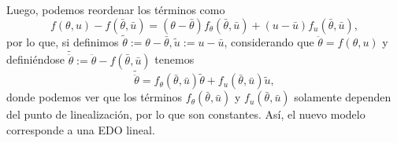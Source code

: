\documentclass[
  11pt,
  letterpaper,
   addpoints,
   answers
  ]{exam}
\begin{document}
\begin{questions}
\begin{solution}
Luego, podemos reordenar los términos como
\begin{equation}
    f(\theta, u) - f(\bar{\theta}, \bar{u}) = (\theta - \bar{\theta}) f_{\theta} (\bar{\theta}, \bar{u}) + (u - \bar{u}) f_{u} (\bar{\theta}, \bar{u}), \tag{35}
\end{equation}
por lo que, si definimos \(\tilde{\theta} := \theta - \bar{\theta}, \tilde{u} := u - \bar{u}\), considerando que \(\ddot{\theta} = f(\theta, u)\) y definiéndose \(\tilde{\ddot{\theta}} := \ddot{\theta} - f (\bar{\theta}, \bar{u})\) tenemos
\begin{equation}
    \tilde{\ddot{\theta}} = f_{\theta} (\bar{\theta}, \bar{u}) \tilde{\theta} + f_{u} (\bar{\theta}, \bar{u}) \tilde{u}, \tag{36}
\end{equation}
donde podemos ver que los términos \(f_{\theta} (\bar{\theta}, \bar{u})\) y \(f_{u} (\bar{\theta}, \bar{u})\) solamente dependen del punto de linealización, por lo que son constantes. Así, el nuevo modelo corresponde a una EDO lineal.


\end{solution}
\end{questions}
\end{document}
